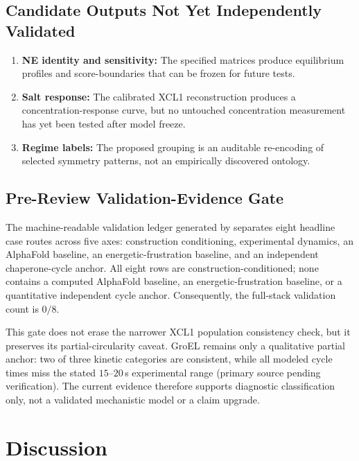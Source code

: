\documentclass[12pt,a4paper]{article}
\begin{document}
\subsection{Candidate Outputs Not Yet Independently Validated}

\begin{enumerate}
  \item \textbf{NE identity and sensitivity:} The specified matrices
    produce equilibrium profiles and score-boundaries that can be frozen
    for future tests.
  \item \textbf{Salt response:} The calibrated XCL1 reconstruction
    produces a concentration-response curve, but no untouched
    concentration measurement has yet been tested after model freeze.
  \item \textbf{Regime labels:} The proposed grouping is an auditable
    re-encoding of selected symmetry patterns, not an empirically
    discovered ontology.
\end{enumerate}

\subsection{Pre-Review Validation-Evidence Gate}

The machine-readable validation ledger generated by
 separates eight
headline case routes across five axes: construction conditioning,
experimental dynamics, an AlphaFold baseline, an energetic-frustration
baseline, and an independent chaperone-cycle anchor. All eight rows are
construction-conditioned; none contains a computed AlphaFold baseline,
an energetic-frustration baseline, or a quantitative independent cycle
anchor. Consequently, the full-stack validation count is $0/8$.

This gate does not erase the narrower XCL1 population consistency check,
but it preserves its partial-circularity caveat. GroEL remains only a
qualitative partial anchor: two of three kinetic categories are
consistent, while all modeled cycle times miss the stated
$15$--$20$\,s experimental range (primary source pending verification). The current evidence therefore supports
diagnostic classification only, not a validated mechanistic model or a
claim upgrade.


\section{Discussion}
\label{sec:discussion}
\end{document}
